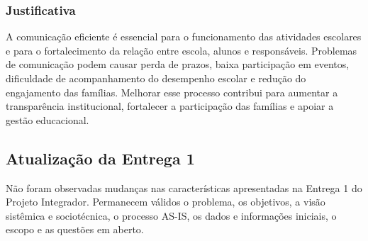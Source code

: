 \subsubsection{Justificativa}
A comunicação eficiente é essencial para o funcionamento das atividades escolares e para o fortalecimento da relação entre escola, alunos e responsáveis. Problemas de comunicação podem causar perda de prazos, baixa participação em eventos, dificuldade de acompanhamento do desempenho escolar e redução do engajamento das famílias. Melhorar esse processo contribui para aumentar a transparência institucional, fortalecer a participação das famílias e apoiar a gestão educacional.

\subsection{Atualização da Entrega 1}
Não foram observadas mudanças nas características apresentadas na Entrega 1 do Projeto Integrador. Permanecem válidos o problema, os objetivos, a visão sistêmica e sociotécnica, o processo AS-IS, os dados e informações iniciais, o escopo e as questões em aberto.
